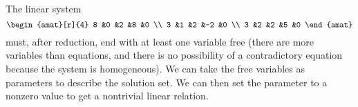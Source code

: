 \begin{Answer}
           The linear system
           \begin{equation*}
             \begin{amat}[r]{4}
               8  &0  &2  &8  &0  \\ 
               3  &1  &2  &-2 &0  \\
               3  &2  &2  &5  &0
             \end{amat}
           \end{equation*}
           must, after reduction, end with at least one variable free
           (there are more variables than equations, and there is no
           possibility of a contradictory equation because the system is
           homogeneous).
           We can take the free variables as parameters to describe the
           solution set.
           We can then set the parameter to a nonzero value to get a
           nontrivial linear relation. 

\end{Answer}
